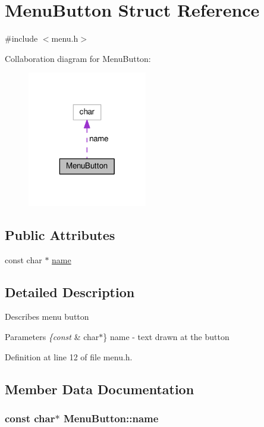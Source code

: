 \hypertarget{struct_menu_button}{\section{Menu\-Button Struct Reference}
\label{struct_menu_button}
}


{\ttfamily \#include $<$menu.\-h$>$}



Collaboration diagram for Menu\-Button\-:
\nopagebreak
\begin{figure}[H]
\begin{center}
\leavevmode
\includegraphics[width=148pt]{struct_menu_button__coll__graph}
\end{center}
\end{figure}
\subsection*{Public Attributes}
\begin{DoxyCompactItemize}
\item 
const char $\ast$ \hyperlink{struct_menu_button_ab20cd84f0366cbb5475c5b1e8de9d72c}{name}
\end{DoxyCompactItemize}


\subsection{Detailed Description}
Describes menu button 
\begin{DoxyParams}{Parameters}
{\em \{const} & char$\ast$\} name -\/ text drawn at the button \\
\hline
\end{DoxyParams}


Definition at line 12 of file menu.\-h.



\subsection{Member Data Documentation}
\hypertarget{struct_menu_button_ab20cd84f0366cbb5475c5b1e8de9d72c}{
\subsubsection[{name}]{\setlength{\rightskip}{0pt plus 5cm}const char$\ast$ Menu\-Button\-::name}}\label{struct_menu_button_ab20cd84f0366cbb5475c5b1e8de9d72c}


